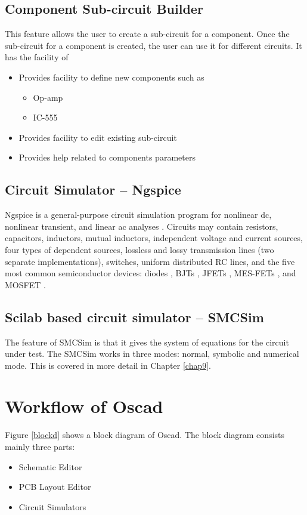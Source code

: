 \subsection{Component Sub-circuit Builder}
This feature allows the user to create a sub-circuit for a component. Once the sub-circuit for a component is created, the user can use it
for different circuits. It has the facility of 
\begin{itemize}
\item Provides facility to define new components such as
\begin{itemize}
\item Op-amp
\item IC-555
\end{itemize}
\item Provides facility to edit existing sub-circuit
\item Provides help related to components parameters
\end{itemize}

\subsection{Circuit Simulator -- Ngspice}
Ngspice is a general-purpose circuit simulation program for nonlinear dc, nonlinear transient, and linear ac analyses \cite{ngspice-web}. Circuits may contain resistors, capacitors, inductors, mutual inductors, independent voltage and current sources, four types of dependent sources, lossless and lossy transmission lines (two separate implementations), switches, uniform distributed RC lines, and the five most common semiconductor devices: diodes , BJTs , JFETs , MES-FETs , and MOSFET .
\subsection{Scilab based circuit simulator -- SMCSim}

The feature of SMCSim  is that it gives the system of equations for the circuit under test. The SMCSim works in three modes: normal, symbolic and numerical mode. This is covered in more detail in Chapter \ref{chap9}.

\section {Workflow of Oscad}
Figure \ref{blockd} shows a block diagram of Oscad. The block diagram consists mainly three parts: 
\begin{itemize}
\item Schematic Editor 
\item PCB Layout Editor  
\item Circuit Simulators
\end{itemize} 


